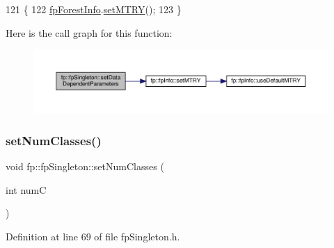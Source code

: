 \begin{DoxyCode}
121                                                     \{
122                 \hyperlink{classfp_1_1fpSingleton_a85965009befa72a749ae498fa5b6ccfa}{fpForestInfo}.\hyperlink{classfp_1_1fpInfo_a6b2a54fb9b3672e7b1bab3474a0ca33f}{setMTRY}();
123             \}
\end{DoxyCode}
Here is the call graph for this function\+:\nopagebreak
\begin{figure}[H]
\begin{center}
\leavevmode
\includegraphics[width=350pt]{classfp_1_1fpSingleton_a3edf17209500e72c76ef816e32666eb2_cgraph}
\end{center}
\end{figure}
\mbox{\label{classfp_1_1fpSingleton_a499e7cef6b463cc24590d05a0d0e6e1c}} 
\subsubsection{\texorpdfstring{set\+Num\+Classes()}{setNumClasses()}}
{\footnotesize\ttfamily void fp\+::fp\+Singleton\+::set\+Num\+Classes (\begin{DoxyParamCaption}\item[{int}]{numC }\end{DoxyParamCaption})\hspace{0.3cm}{\ttfamily [inline]}}



Definition at line 69 of file fp\+Singleton.\+h.


